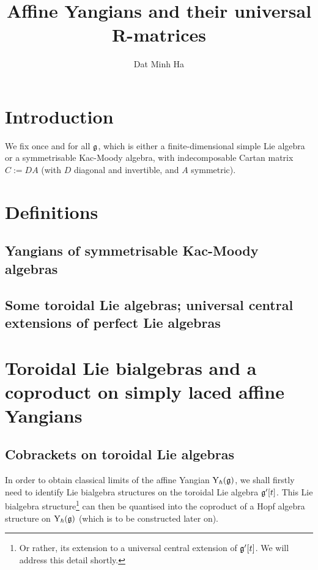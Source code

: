 

\setcounter{section}{-1}





    \title{Affine Yangians and their universal R-matrices}
    
    \author{Dat Minh Ha}
    \maketitle
    
    \begin{abstract}
    
    \end{abstract}
    
    {
    \hypersetup{} 
    \tableofcontents %
    }

    \section{Introduction}
        We fix once and for all $\mathfrak{g}$, which is either a finite-dimensional simple Lie algebra or a symmetrisable Kac-Moody algebra, with indecomposable Cartan matrix $C := DA$ (with $D$ diagonal and invertible, and $A$ symmetric). 

    \section{Definitions}
        \subsection{Yangians of symmetrisable Kac-Moody algebras}

        \subsection{Some toroidal Lie algebras; universal central extensions of perfect Lie algebras}

    \section{Toroidal Lie bialgebras and a coproduct on simply laced affine Yangians}
        \subsection{Cobrackets on toroidal Lie algebras}
            In order to obtain classical limits of the affine Yangian $\mathrm{Y}_{\hbar}(\mathfrak{g})$, we shall firstly need to identify Lie bialgebra structures on the toroidal Lie algebra $\mathfrak{g}'[t]$. This Lie bialgebra structure\footnote{Or rather, its extension to a universal central extension of $\mathfrak{g}'[t]$. We will address this detail shortly.} can then be quantised into the coproduct of a Hopf algebra structure on $\mathrm{Y}_{\hbar}(\mathfrak{g})$ (which is to be constructed later on). 

